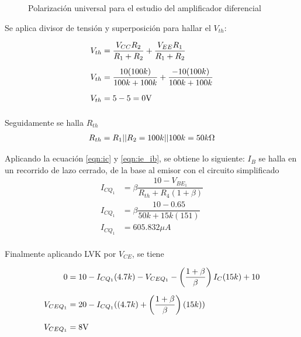 \begin{enumerate}
        \begin{figure}[H]
          \centering
          \caption{Polarización universal para el estudio del amplificador diferencial}
          \label{fig:universall}
        \end{figure}

        Se aplica divisor de tensión y superposición para hallar el  $V_{th}$:

        \begin{align*}
          V_{th} & = \dfrac{V_{CC}R_{2}}{R_1+R_2}+\dfrac{V_{EE}R_{1}}{R_1+R_2} \\[0.2cm]
          V_{th} & = \dfrac{10(100k)}{100k+100k}+\dfrac{-10(100k)}{100k+100k}  \\[0.2cm]
          V_{th} & = 5-5 = 0\volt                                              \\[0.2cm]
        \end{align*}

        Seguidamente se halla $R_{th}$
        \begin{align*}
          R_{th}=R_1||R_2=100k||100k=50k\ohm
        \end{align*}



        Aplicando la ecuación \ref{eqn:ic} y \ref{eqn:ie_ib}, se obtiene lo siguiente:
        $I_B$ se halla en un recorrido de lazo cerrado, de la base al emisor con el circuito simplificado
        \begin{align*}
          I_{CQ_1} & =\beta \dfrac{10-V_{BE_1}}{R_{th}+R_4(1+\beta)} \\[0.2cm]
          I_{CQ_1} & =\beta \dfrac{10-0.65}{50k+15k(151)}            \\[0.2cm]
          I_{CQ_1} & =605.832 \mu A                                  \\[0.2cm]
        \end{align*}

        Finalmente aplicando LVK por $V_{CE}$, se tiene


        \begin{align*}
          0         & =10-I_{CQ_1}(4.7k)-V_{CEQ_1}-\left(\dfrac{1+\beta}{\beta}\right)I_C(15k)+10 \\[0.2cm]
          V_{CEQ_1} & =20-I_{CQ_1}((4.7k)+\left(\dfrac{1+\beta}{\beta}\right)(15k))               \\[0.2cm]
          V_{CEQ_1} & = 8\volt                                                                    \\[0.2cm]
        \end{align*}


\end{enumerate}
